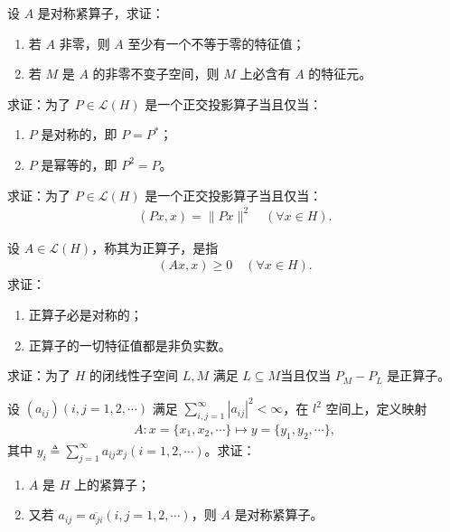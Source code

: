 \documentclass[../../main.tex]{subfiles}%
\begin{document}
\begin{example}
设 $A$ 是对称紧算子，求证：
\begin{enumerate}[(1)]
\item 若 $A$ 非零，则 $A$ 至少有一个不等于零的特征值；
\item 若 $M$ 是 $A$ 的非零不变子空间，则 $M$ 上必含有 $A$ 的特征元。
\end{enumerate}
\end{example}

\begin{example}
求证：为了 $P \in \mathscr{L}(H)$ 是一个正交投影算子当且仅当：
\begin{enumerate}[(1)]
\item $P$ 是对称的，即 $P = P^*$；
\item $P$ 是幂等的，即 $P^2 = P$。
\end{enumerate}
\end{example}

\begin{example}
求证：为了 $P \in \mathscr{L}(H)$ 是一个正交投影算子当且仅当：
\begin{align*}
(Px,x) = \|Px\|^2 \quad (\forall x \in H).
\end{align*}
\end{example}

\begin{example}
设 $A \in \mathscr{L}(H)$，称其为正算子，是指
\begin{align*}
(Ax,x) \geqslant 0 \quad (\forall x \in H).
\end{align*}
求证：
\begin{enumerate}[(1)]
\item 正算子必是对称的；
\item 正算子的一切特征值都是非负实数。
\end{enumerate}
\end{example}

\begin{example}
求证：为了 $H$ 的闭线性子空间 $L,M$ 满足 $L \subseteq M$当且仅当 $P_M - P_L$ 是正算子。
\end{example}

\begin{example}
设 $(a_{ij})(i,j=1,2,\cdots)$ 满足 $\sum\limits_{i,j=1}^{\infty} |a_{ij}|^2 < \infty$，在 $l^2$ 空间上，定义映射
\begin{align*}
A: x = \{x_1,x_2,\cdots\} \mapsto y = \{y_1,y_2,\cdots\},
\end{align*}
其中 $y_i \triangleq \sum\limits_{j=1}^{\infty} a_{ij}x_j(i=1,2,\cdots)$。求证：
\begin{enumerate}[(1)]
\item $A$ 是 $H$ 上的紧算子；
\item 又若 $a_{ij} = \overline{a_{ji}}(i,j=1,2,\cdots)$，则 $A$ 是对称紧算子。
\end{enumerate}
\end{example}
\end{document}
